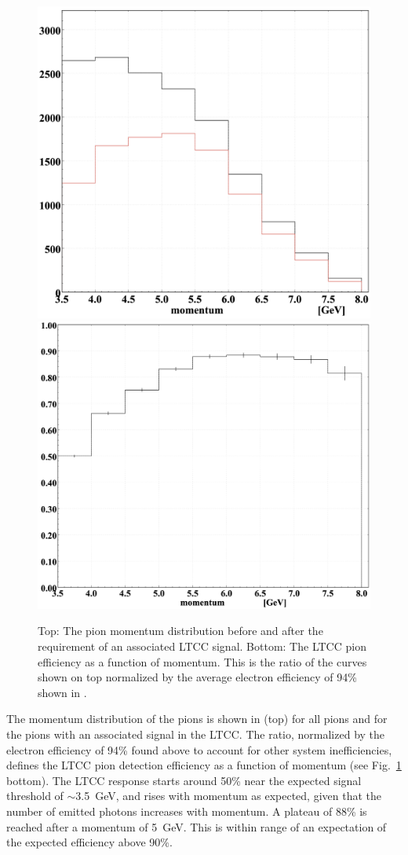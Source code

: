 \begin{figure}[H]
	\centering
	\includegraphics[width=0.98\columnwidth, height=0.7\columnwidth]{img/pionMomentum.png}
	\includegraphics[width=0.98\columnwidth, height=0.7\columnwidth]{img/pionEfficiency.png}
	\caption{Top: The pion momentum distribution before and after the requirement of an associated LTCC signal.
				Bottom: The LTCC pion efficiency as a function of momentum. This is the ratio of the curves shown on top
			   normalized by the average electron efficiency of 94\% shown in . }
	\label{fig:pionMomentum}
\end{figure}

The momentum distribution of the pions is shown in  (top) for all pions and for the pions with an
associated signal in the LTCC. The ratio, normalized by the electron efficiency of 94\% found above to account for
other system inefficiencies, defines the LTCC pion detection efficiency as a function of momentum (see
Fig.~\ref{fig:pionMomentum} bottom). The LTCC response starts around 50\% near the expected signal threshold of
$\sim$3.5~GeV, and rises with momentum as expected, given that the number of emitted photons increases with
momentum. A plateau of 88\% is reached after a momentum of 5~GeV. This is within range of an expectation of
the expected efficiency above 90\%.
